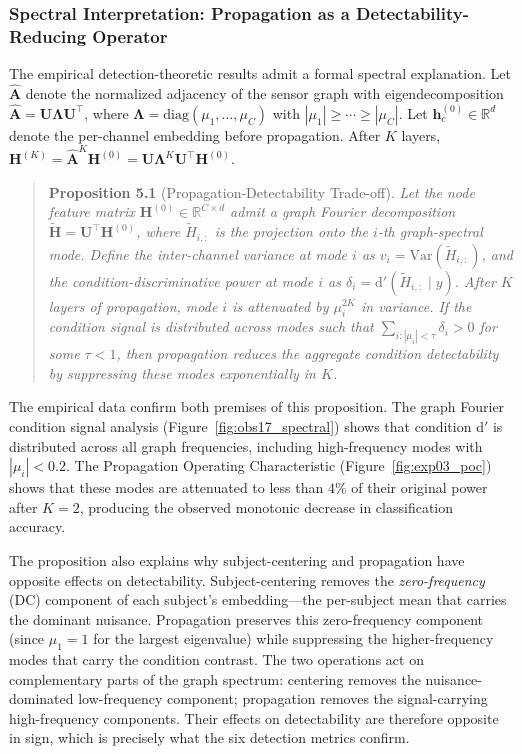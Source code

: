 \subsubsection{Spectral Interpretation: Propagation as a Detectability-Reducing Operator}

The empirical detection-theoretic results admit a formal spectral explanation. Let $\hat{\mathbf{A}}$ denote the normalized adjacency of the sensor graph with eigendecomposition $\hat{\mathbf{A}} = \mathbf{U}\boldsymbol{\Lambda}\mathbf{U}^\top$, where $\boldsymbol{\Lambda} = \text{diag}(\mu_1, \ldots, \mu_C)$ with $|\mu_1| \geq \cdots \geq |\mu_C|$. Let $\mathbf{h}_c^{(0)} \in \mathbb{R}^d$ denote the per-channel embedding before propagation. After $K$ layers, $\mathbf{H}^{(K)} = \hat{\mathbf{A}}^K \mathbf{H}^{(0)} = \mathbf{U}\boldsymbol{\Lambda}^K\mathbf{U}^\top \mathbf{H}^{(0)}$.

\begin{quote}
\textbf{Proposition 5.1} (Propagation-Detectability Trade-off). \emph{Let the node feature matrix $\mathbf{H}^{(0)} \in \mathbb{R}^{C \times d}$ admit a graph Fourier decomposition $\tilde{\mathbf{H}} = \mathbf{U}^\top \mathbf{H}^{(0)}$, where $\tilde{H}_{i,:}$ is the projection onto the $i$-th graph-spectral mode. Define the inter-channel variance at mode $i$ as $v_i = \text{Var}(\tilde{H}_{i,:})$, and the condition-discriminative power at mode $i$ as $\delta_i = \text{d}'(\tilde{H}_{i,:} \mid y)$. After $K$ layers of propagation, mode $i$ is attenuated by $\mu_i^{2K}$ in variance. If the condition signal is distributed across modes such that $\sum_{i: |\mu_i| < \tau} \delta_i > 0$ for some $\tau < 1$, then propagation reduces the aggregate condition detectability by suppressing these modes exponentially in $K$.}
\end{quote}

The empirical data confirm both premises of this proposition. The graph Fourier condition signal analysis (Figure~\ref{fig:obs17_spectral}) shows that condition d$'$ is distributed across all graph frequencies, including high-frequency modes with $|\mu_i| < 0.2$. The Propagation Operating Characteristic (Figure~\ref{fig:exp03_poc}) shows that these modes are attenuated to less than $4\%$ of their original power after $K = 2$, producing the observed monotonic decrease in classification accuracy.

The proposition also explains why subject-centering and propagation have opposite effects on detectability. Subject-centering removes the \emph{zero-frequency} (DC) component of each subject's embedding---the per-subject mean that carries the dominant nuisance. Propagation preserves this zero-frequency component (since $\mu_1 = 1$ for the largest eigenvalue) while suppressing the higher-frequency modes that carry the condition contrast. The two operations act on complementary parts of the graph spectrum: centering removes the nuisance-dominated low-frequency component; propagation removes the signal-carrying high-frequency components. Their effects on detectability are therefore opposite in sign, which is precisely what the six detection metrics confirm.

